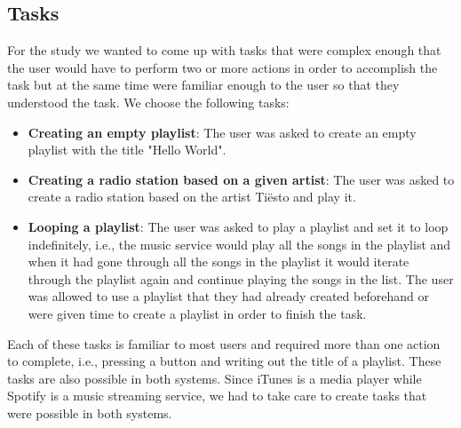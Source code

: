 \documentclass[11pt]{article}
\begin{document}
\subsection{Tasks}
For the study we wanted to come up with tasks that were complex enough that the user would have to perform two or more actions in order to accomplish the task but at the same time were familiar enough to the user so that they understood the task. We choose the following tasks:
\begin{itemize}
    \item \textbf{Creating an empty playlist}: The user was asked to create an empty playlist with the title "Hello World".
    \item \textbf{Creating a radio station based on a given artist}: The user was asked to create a radio station based on the artist Ti\"{e}sto and play it.
    \item \textbf{Looping a playlist}: The user was asked to play a playlist and set it to loop indefinitely, i.e., the music service would play all the songs in the playlist and when it had gone through all the songs in the playlist it would iterate through the playlist again and continue playing the songs in the list. The user was allowed to use a playlist that they had already created beforehand or were given time to create a playlist in order to finish the task.  
\end{itemize} 

Each of these tasks is familiar to most users and required more than one action to complete, i.e., pressing a button and writing out the title of a playlist. These tasks are also possible in both systems. Since iTunes is a media player while Spotify is a music streaming service, we had to take care to create tasks that were possible in both systems. 
\end{document}
